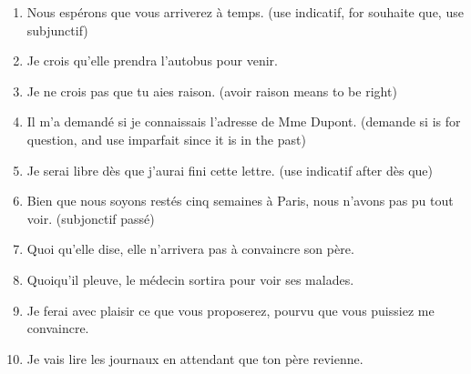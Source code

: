 \documentclass{book}
\begin{document}
        \begin{enumerate}
            \item Nous espérons que vous arriverez à temps. (use indicatif, for souhaite que, use subjunctif)
            \item Je crois qu'elle prendra l'autobus pour venir.
            \item Je ne crois pas que tu aies raison. (avoir raison means to be right)
            \item Il m'a demandé si je connaissais l'adresse de Mme Dupont. (demande si is for question, and use imparfait since it is in the past)
            \item Je serai libre dès que j'aurai fini cette lettre. (use indicatif after dès que)
            \item Bien que nous soyons restés cinq semaines à Paris, nous n'avons pas pu tout voir. (subjonctif passé)
            \item Quoi qu'elle dise, elle n'arrivera pas à convaincre son père.
            \item Quoiqu'il pleuve, le médecin sortira pour voir ses malades.
            \item Je ferai avec plaisir ce que vous proposerez, pourvu que vous puissiez me convaincre.
            \item Je vais lire les journaux en attendant que ton père revienne.
        \end{enumerate}
\end{document}
